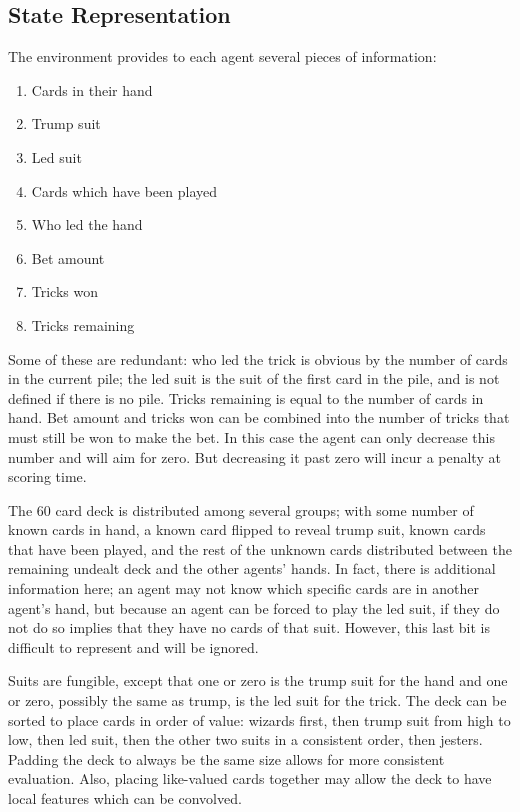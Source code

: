 \documentclass[10pt]{article} %
\begin{document}
\newpage

\subsection{State Representation}

The environment provides to each agent several pieces of information:

\begin{enumerate}[noitemsep]
\item Cards in their hand
\item Trump suit
\item Led suit
\item Cards which have been played
\item Who led the hand
\item Bet amount
\item Tricks won
\item Tricks remaining
\end{enumerate}

Some of these are redundant: who led the trick is obvious by the number of cards in the current pile; the led suit is the suit of the first card in the pile, and is not defined if there is no pile. Tricks remaining is equal to the number of cards in hand. Bet amount and tricks won can be combined into the number of tricks that must still be won to make the bet. In this case the agent can only decrease this number and will aim for zero. But decreasing it past zero will incur a penalty at scoring time.

The 60 card deck is distributed among several groups; with some number of known cards in hand, a known card flipped to reveal trump suit, known cards that have been played, and the rest of the unknown cards distributed between the remaining undealt deck and the other agents’ hands. In fact, there is additional information here; an agent may not know which specific cards are in another agent’s hand, but because an agent can be forced to play the led suit, if they do not do so implies that they have no cards of that suit. However, this last bit is difficult to represent and will be ignored.

Suits are fungible, except that one or zero is the trump suit for the hand and one or zero, possibly the same as trump, is the led suit for the trick. The deck can be sorted to place cards in order of value: wizards first, then trump suit from high to low, then led suit, then the other two suits in a consistent order, then jesters. Padding the deck to always be the same size allows for more consistent evaluation. Also, placing like-valued cards together may allow the deck to have local features which can be convolved.
\end{document}
